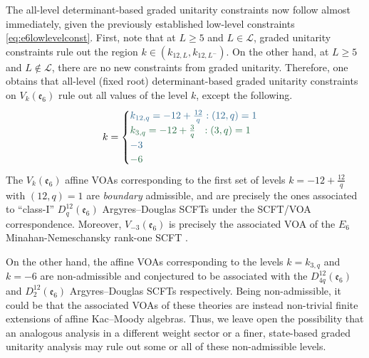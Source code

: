 The all-level determinant-based graded unitarity constraints now follow almost immediately, given the previously established low-level constraints \eqref{eq:e6lowlevelconst}. First, note that at $L \geqslant 5$ and $L \in \mathcal{L}$, graded unitarity constraints rule out the region $k \in (k_{12, L}, k_{12, L^-})$. On the other hand, at $L \geqslant 5$ and $L \notin \mathcal{L}$, there are no new constraints from graded unitarity. Therefore, one obtains that all-level (fixed root) determinant-based graded unitarity constraints on $V_k(\mathfrak{e}_6)$ rule out all values of the level $k$, except the following.
\begin{equation} \label{eq:e6alllevel}
    k = \begin{cases}
        \textcolor{knownSCFTtext}{k_{12,q} = -12 + \frac{12}{q}: (12,q) = 1} \\
        \textcolor{conjecturedSCFTtext}{k_{3,q} = -12 + \frac{3}{q} \ \ : (3,q) = 1} \\
        \textcolor{knownSCFTtext}{-3} \\ 
        \textcolor{conjecturedSCFTtext}{-6}
    \end{cases}
\end{equation}
The $V_k(\mathfrak{e}_6)$ affine VOAs corresponding to the first set of levels $k = -12+\frac{12}{q}$ with $(12,q) = 1$ are \emph{boundary} admissible, and are precisely the ones associated to ``class-I'' $D_q^{12}(\mathfrak{e}_6)$ Argyres--Douglas SCFTs under the SCFT/VOA correspondence. Moreover, $V_{-3}(\mathfrak{e}_6)$ is precisely the associated VOA of the $E_6$ Minahan-Nemeschansky rank-one SCFT \cite{Minahan:1996fg}.

On the other hand, the affine VOAs corresponding to the levels $k = k_{3,q}$ and $k = -6$ are non-admissible and conjectured to be associated with the $D_{4q}^{12}(\mathfrak{e}_6)$ and $D_{2}^{12}(\mathfrak{e}_6)$ Argyres--Douglas SCFTs respectively. Being non-admissible, it could be that the associated VOAs of these theories are instead non-trivial finite extensions of affine Kac--Moody algebras. Thus, we leave open the possibility that an analogous analysis in a different weight sector or a finer, state-based graded unitarity analysis may rule out some or all of these non-admissible levels. 

